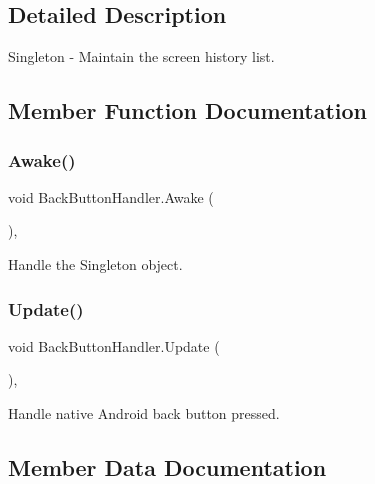 \subsection{Detailed Description}
Singleton -\/ Maintain the screen history list. 

\subsection{Member Function Documentation}
\mbox{\label{class_back_button_handler_ac35dc3235b4f8a0b86645237b2490ace}} 
\subsubsection{\texorpdfstring{Awake()}{Awake()}}
{\footnotesize\ttfamily void Back\+Button\+Handler.\+Awake (\begin{DoxyParamCaption}{ }\end{DoxyParamCaption})\hspace{0.3cm}{\ttfamily [inline]}, {\ttfamily [private]}}



Handle the Singleton object. 

\mbox{\label{class_back_button_handler_a35b84c30f2f379a6722cef7d347eaf80}} 
\subsubsection{\texorpdfstring{Update()}{Update()}}
{\footnotesize\ttfamily void Back\+Button\+Handler.\+Update (\begin{DoxyParamCaption}{ }\end{DoxyParamCaption})\hspace{0.3cm}{\ttfamily [inline]}, {\ttfamily [private]}}



Handle native Android back button pressed. 



\subsection{Member Data Documentation}
\mbox{\label{class_back_button_handler_a6fd6f32fc652c5be872ebdeef591ecfe}} 
